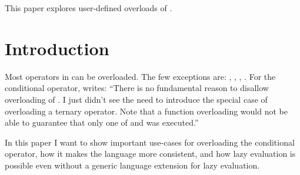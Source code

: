 \newcommand\wgTitle{Making operator?: overloadable}
\newcommand\wgName{Matthias Kretz <m.kretz@gsi.de>}
\newcommand\wgDocumentNumber{D0917R4}
\newcommand\wgGroup{EWG}
\newcommand\wgTarget{\CC{}23}

\usepackage{mymacros}
\usepackage{wg21}
\usepackage{changelog}
\usepackage{underscore}



\newcommand\simd[1][]{\type{simd#1}\xspace}
\newcommand\simdT{\type{simd<T>}\xspace}
\newcommand\valuetype{\type{value\_type}\xspace}
\newcommand\referencetype{\type{reference}\xspace}
\newcommand\whereexpression{\type{where\_expression}\xspace}
\newcommand\simdcast{\code{simd\_cast}\xspace}
\newcommand\mask[1][]{\type{simd\_mask#1}\xspace}
\newcommand\maskT{\type{simd\_mask<T>}\xspace}
\newcommand\fixedsizeN{\type{simd\_abi::fixed\_size<N>}\xspace}
\newcommand\fixedsizescoped{\type{simd\_abi::fixed\_size}\xspace}
\newcommand\fixedsize{\type{fixed\_size}\xspace}
\newcommand\simdEP{\code{execution::}\type{simd}\xspace}
\newcommand\seqEP{\code{execution::}\type{seq}\xspace}


\begin{wgTitlepage}
  This paper explores user-defined overloads of .
\end{wgTitlepage}

\pagestyle{scrheadings}
\section{Introduction}
Most operators in \CC{} can be overloaded.
The few exceptions are: , \code{::}, , .
For the conditional operator, \textcite{StrFaq} writes:
“There is no fundamental reason to disallow overloading of .
I just didn't see the need to introduce the special case of overloading a ternary operator.
Note that a function overloading  would not be able to guarantee that only one of  and  was executed.”

In this paper I want to show important use-cases for overloading the conditional operator, how it makes the language more consistent, and how lazy evaluation is possible even without a generic language extension for lazy evaluation.

